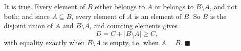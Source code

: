 It is true. Every element of $B$ either belongs to $A$ or belongs to $B\setminus A$, and not both; and since $A\subseteq B$, every element of $A$ is an element of $B$. So $B$ is the disjoint union of $A$ and $B\setminus A$, and counting elements gives
\[D=C+\left|B\setminus A\right|\ge C,\]
with equality exactly when $B\setminus A$ is empty, i.e. when $A=B$. $\blacksquare$
